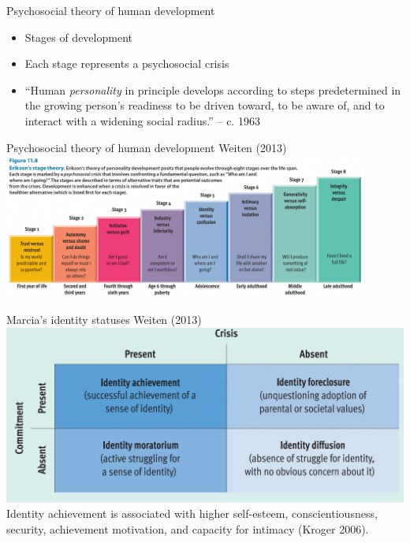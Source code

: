 \documentclass[
  ignorenonframetext,
  aspectratio=169,
]{beamer}
\providecommand{\tightlist}{%
  \setlength{\itemsep}{0pt}\setlength{\parskip}{0pt}}\usepackage{longtable,booktabs,array}
\begin{document}
\begin{frame}{Psychosocial theory of human development}
\label{psychosocial-theory-of-human-development}
\begin{itemize}[<+->]
\tightlist
\item
  Stages of development
\item
  Each stage represents a psychosocial crisis
\item
  ``Human \emph{personality} in principle develops according to steps
  predetermined in the growing person's readiness to be driven toward,
  to be aware of, and to interact with a widening social radius.'' -- c.
  1963
\end{itemize}
\end{frame}

\begin{frame}{Psychosocial theory of human development}
\label{psychosocial-theory-of-human-development-1}
Weiten (2013)
\includegraphics[width=0.9\textwidth,height=\textheight]{figs/stages.png}
\end{frame}

\begin{frame}{Marcia's identity statuses}
\label{marcias-identity-statuses}
Weiten (2013) \includegraphics{figs/marcia.png} Identity achievement is
associated with higher self-esteem, conscientiousness, security,
achievement motivation, and capacity for intimacy (Kroger 2006).
\end{frame}
\end{document}
